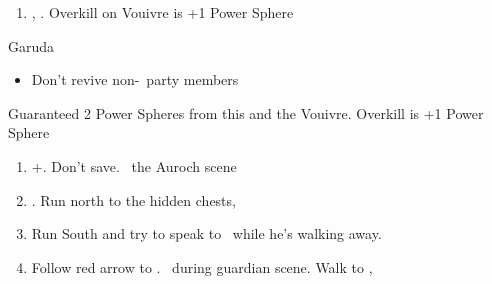 \begin{enumerate}[resume]
	\item \sd, \skippablefmv. Overkill on Vouivre is +1 Power Sphere
\end{enumerate}
\begin{battle}[1800]{Garuda}
	\begin{itemize}
		\tidusf Haste \auron
		\auronf Attack x3
		\wakkaf Defend, Potion if \tidus\ is less than 312 HP
		\tidusf Attack
		\tidusf Defend
		\wakkaf Defend, Potion if \auron\ is less than 202 HP
		\auronf Attack x3
		\item Don't revive non-\auron\ party members
	\end{itemize}
	Guaranteed 2 Power Spheres from this and the Vouivre. Overkill is +1 Power Sphere
\end{battle}
\begin{enumerate}[resume]
	\item \cs+\skippablefmv[1:30]. Don't save. \sd\ the Auroch scene
	\item \cs[4:50]. Run north to the hidden chests, 
	\item Run South and try to speak to \auron\ while he's walking away.
	\item Follow red arrow to \yuna. \sd\ during guardian scene. Walk to \yuna, \cs[4:20]
\end{enumerate}